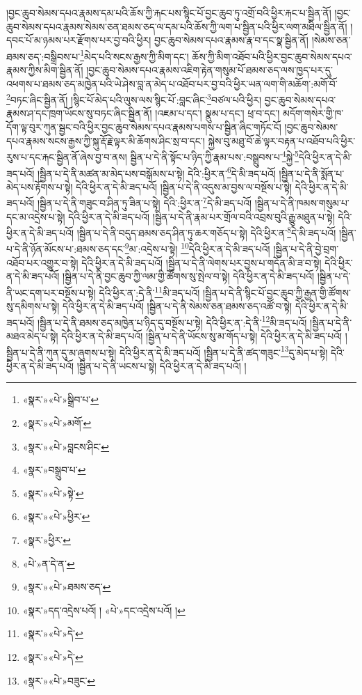 །བྱང་ཆུབ་སེམས་དཔའ་རྣམས་དམ་པའི་ཆོས་ཀྱི་རྐང་པས་སྙིང་པོ་བྱང་ཆུབ་ཏུ་འགྲོ་བའི་ཕྱིར་རྐང་པ་སྦྱིན་ནོ། །བྱང་ཆུབ་སེམས་དཔའ་རྣམས་སེམས་ཅན་ཐམས་ཅད་ལ་དམ་པའི་ཆོས་ཀྱི་ལག་པ་སྦྱིན་པའི་ཕྱིར་ལག་མཐིལ་སྦྱིན་ནོ། །དབང་པོ་མ་ཉམས་པར་རྫོགས་པར་བྱ་བའི་ཕྱིར། བྱང་ཆུབ་སེམས་དཔའ་རྣམས་རྣ་བ་དང་སྣ་སྦྱིན་ནོ། །སེམས་ཅན་ཐམས་ཅད་:བསྒྲིབས་པ་\footnote{«སྣར་»«པེ་»སྒྲིབ་པ་}མེད་པའི་སངས་རྒྱས་ཀྱི་མིག་དང་། ཆོས་ཀྱི་མིག་འཐོབ་པའི་ཕྱིར་བྱང་ཆུབ་སེམས་དཔའ་རྣམས་ཀྱིས་མིག་སྦྱིན་ནོ། །བྱང་ཆུབ་སེམས་དཔའ་རྣམས་འཇིག་རྟེན་གསུམ་པོ་ཐམས་ཅད་ལས་ཁྱད་པར་དུ་འཕགས་པ་ཐམས་ཅད་མཁྱེན་པའི་ཡེ་ཤེས་བླ་ན་མེད་པ་འཐོབ་པར་བྱ་བའི་ཕྱིར་ཡན་ལག་གི་མཆོག་:མགོ་བོ་\footnote{«སྣར་»«པེ་»མགོ་}བཏང་ཞིང་སྦྱིན་ནོ། །སྙིང་པོ་མེད་པའི་ལུས་ལས་སྙིང་པོ་:བླང་ཞིང་\footnote{«སྣར་»«པེ་»བླངས་ཤིང་}བཙལ་པའི་ཕྱིར། བྱང་ཆུབ་སེམས་དཔའ་རྣམས་ཤ་དང་ཁྲག་ཡོངས་སུ་བཏང་ཞིང་སྦྱིན་ནོ། །འཇམ་པ་དང་། སྣུམ་པ་དང་། ཕྲ་བ་དང་། མདོག་གསེར་གྱི་ཁ་དོག་ལྟ་བུར་ཀུན་སྦྱང་བའི་ཕྱིར་བྱང་ཆུབ་སེམས་དཔའ་རྣམས་པགས་པ་སྦྱིན་ཞིང་གཏོང་ངོ། །བྱང་ཆུབ་སེམས་དཔའ་རྣམས་སངས་རྒྱས་ཀྱི་སྐུ་རྡོ་རྗེ་ལྟར་མི་ཆོགས་ཤིང་སྲ་བ་དང་། སྐྱེས་བུ་མཐུ་བོ་ཆེ་ལྟར་བརྟན་པ་འཐོབ་པའི་ཕྱིར་རུས་པ་དང་རྐང་སྦྱིན་ནོ་ཞེས་བྱ་བ་ནས། སྦྱིན་པ་དེ་ནི་སྟོང་པ་ཉིད་ཀྱི་རྣམ་པས་:བསྒྲུབས་པ་\footnote{«སྣར་»བསྒྲུབ་པ་}སྐྱེ་\footnote{«སྣར་»«པེ་»སྟེ་}དེའི་ཕྱིར་ན་དེ་མི་ཟད་པའོ། །སྦྱིན་པ་དེ་ནི་མཚན་མ་མེད་པས་བསྒོམས་པ་སྟེ། དེའི་:ཕྱིར་ན་\footnote{«སྣར་»«པེ་»ཕྱིར་}དེ་མི་ཟད་པའོ། །སྦྱིན་པ་དེ་ནི་སྨོན་པ་མེད་པས་རྟོགས་པ་སྟེ། དེའི་ཕྱིར་ན་དེ་མི་ཟད་པའོ། །སྦྱིན་པ་དེ་ནི་འདུས་མ་བྱས་ལ་བསྔོས་པ་སྟེ། དེའི་ཕྱིར་ན་དེ་མི་ཟད་པའོ། །སྦྱིན་པ་དེ་ནི་གཟུང་བ་ཤིན་ཏུ་ཟིན་པ་སྟེ། དེའི་:ཕྱིར་ན་\footnote{«སྣར་»ཕྱིར་}དེ་མི་ཟད་པའོ། །སྦྱིན་པ་དེ་ནི་ཁམས་གསུམ་པ་དང་མ་འདྲེས་པ་སྟེ། དེའི་ཕྱིར་ན་དེ་མི་ཟད་པའོ། །སྦྱིན་པ་དེ་ནི་རྣམ་པར་གྲོལ་བའི་འབྲས་བུའི་རྒྱུ་མཐུན་པ་སྟེ། དེའི་ཕྱིར་ན་དེ་མི་ཟད་པའོ། །སྦྱིན་པ་དེ་ནི་བདུད་ཐམས་ཅད་ཤིན་ཏུ་ཆར་གཅོད་པ་སྟེ། དེའི་ཕྱིར་ན་\footnote{«པེ་»ན་དེ་ན་}དེ་མི་ཟད་པའོ། །སྦྱིན་པ་དེ་ནི་ཉོན་མོངས་པ་:ཐམས་ཅད་དང་\footnote{«སྣར་»«པེ་»ཐམས་ཅད་}མ་:འདྲེས་པ་སྟེ། \footnote{«སྣར་»དད་འདྲེས་པའོ། ། «པེ་»དང་འདྲེས་པའོ། ། }དེའི་ཕྱིར་ན་དེ་མི་ཟད་པའོ། །སྦྱིན་པ་དེ་ནི་བྱེ་བྲག་འཐོབ་པར་འགྱུར་བ་སྟེ། དེའི་ཕྱིར་ན་དེ་མི་ཟད་པའོ། །སྦྱིན་པ་དེ་ནི་ལེགས་པར་བྱས་པ་གདོན་མི་ཟ་བ་སྟེ། དེའི་ཕྱིར་ན་དེ་མི་ཟད་པའོ། །སྦྱིན་པ་དེ་ནི་བྱང་ཆུབ་ཀྱི་ལམ་གྱི་ཚོགས་སུ་སྤེལ་བ་སྟེ། དེའི་ཕྱིར་ན་དེ་མི་ཟད་པའོ། །སྦྱིན་པ་དེ་ནི་ཡང་དག་པར་བསྔོས་པ་སྟེ། དེའི་ཕྱིར་ན་:དེ་ནི་\footnote{«སྣར་»«པེ་»དེ་}མི་ཟད་པའོ། །སྦྱིན་པ་དེ་ནི་སྙིང་པོ་བྱང་ཆུབ་ཀྱི་རྒྱན་གྱི་ཚོགས་སུ་དམིགས་པ་སྟེ། དེའི་ཕྱིར་ན་དེ་མི་ཟད་པའོ། །སྦྱིན་པ་དེ་ནི་སེམས་ཅན་ཐམས་ཅད་འཚོ་བ་སྟེ། དེའི་ཕྱིར་ན་དེ་མི་ཟད་པའོ། །སྦྱིན་པ་དེ་ནི་ཐམས་ཅད་མཁྱེན་པ་ཉིད་དུ་བསྔོས་པ་སྟེ། དེའི་ཕྱིར་ན་:དེ་ནི་\footnote{«སྣར་»«པེ་»དེ་}མི་ཟད་པའོ། །སྦྱིན་པ་དེ་ནི་མཐའ་མེད་པ་སྟེ། དེའི་ཕྱིར་ན་དེ་མི་ཟད་པའོ། །སྦྱིན་པ་དེ་ནི་ཡོངས་སུ་མ་གོད་པ་སྟེ། དེའི་ཕྱིར་ན་དེ་མི་ཟད་པའོ། །སྦྱིན་པ་དེ་ནི་ཀུན་དུ་མ་ཞུགས་པ་སྟེ། དེའི་ཕྱིར་ན་དེ་མི་ཟད་པའོ། །སྦྱིན་པ་དེ་ནི་ཚད་གཟུང་\footnote{«སྣར་»«པེ་»བཟུང་}དུ་མེད་པ་སྟེ། དེའི་ཕྱིར་ན་དེ་མི་ཟད་པའོ། །སྦྱིན་པ་དེ་ནི་ཡངས་པ་སྟེ། དེའི་ཕྱིར་ན་དེ་མི་ཟད་པའོ། །
